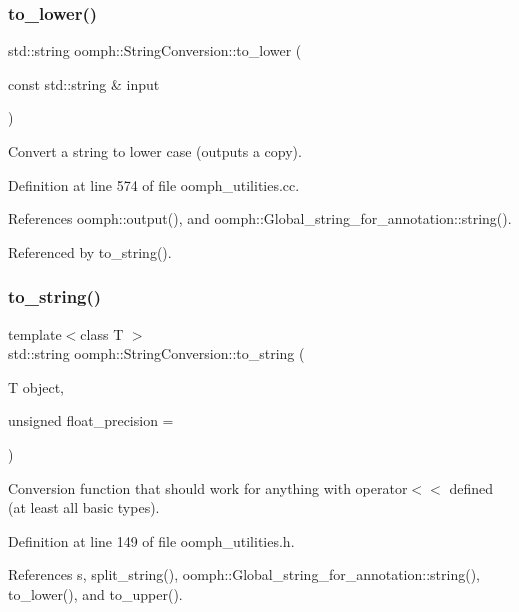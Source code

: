 \subsubsection{\texorpdfstring{to\+\_\+lower()}{to\_lower()}}
{\footnotesize\ttfamily std\+::string oomph\+::\+String\+Conversion\+::to\+\_\+lower (\begin{DoxyParamCaption}\item[{const std\+::string \&}]{input }\end{DoxyParamCaption})}



Convert a string to lower case (outputs a copy). 



Definition at line 574 of file oomph\+\_\+utilities.\+cc.



References oomph\+::output(), and oomph\+::\+Global\+\_\+string\+\_\+for\+\_\+annotation\+::string().



Referenced by to\+\_\+string().

\mbox{\label{namespaceoomph_1_1StringConversion_a9d30fabdc1a0694bdb91dddd2833bbd6}} 
\subsubsection{\texorpdfstring{to\+\_\+string()}{to\_string()}}
{\footnotesize\ttfamily template$<$class T $>$ \\
std\+::string oomph\+::\+String\+Conversion\+::to\+\_\+string (\begin{DoxyParamCaption}\item[{T}]{object,  }\item[{unsigned}]{float\+\_\+precision = {} }\end{DoxyParamCaption})}



Conversion function that should work for anything with operator$<$$<$ defined (at least all basic types). 



Definition at line 149 of file oomph\+\_\+utilities.\+h.



References s, split\+\_\+string(), oomph\+::\+Global\+\_\+string\+\_\+for\+\_\+annotation\+::string(), to\+\_\+lower(), and to\+\_\+upper().



